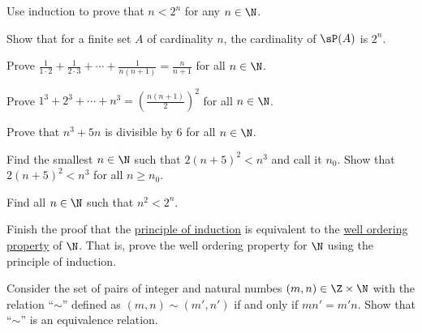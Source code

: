 \documentclass[12pt]{book}
\begin{document}
\begin{exercise}
Use induction to prove that $n < 2^n$ for any $n\in\N$.
\end{exercise}

\begin{exercise}
Show that for a finite set $A$ of cardinality $n$, the cardinality
of $\sP(A)$ is $2^n$.
\end{exercise}

\begin{exercise}
Prove $\frac{1}{1\cdot 2} + 
\frac{1}{2\cdot 3} + \cdots + \frac{1}{n(n+1)} = \frac{n}{n+1}$
for all $n \in \N$.
\end{exercise}

\begin{exercise}
Prove $1^3 + 2^3 + \cdots + n^3 = {\left( \frac{n(n+1)}{2} \right)}^2$
for all $n \in \N$.
\end{exercise}

\begin{exercise}
Prove that $n^3 + 5n$ is divisible by $6$ for all $n \in \N$.
\end{exercise}

\begin{exercise}
Find the smallest $n \in \N$ such that $2{(n+5)}^2 < n^3$ and call it $n_0$.
Show that $2{(n+5)}^2 < n^3$ for all $n \geq n_0$.
\end{exercise}

\begin{exercise}
Find all $n \in \N$ such that $n^2 < 2^n$.
\end{exercise}

\begin{exercise}
Finish the proof that the \hyperref[induction:thm]{principle of induction} is equivalent to the
\hyperlink{wop:link}{well ordering property}  of $\N$.
That is, prove the well ordering property for $\N$ using the principle of induction.
\end{exercise}

\begin{exercise} Consider the set of pairs of integer and natural numbes $(m,n)\in \Z\times \N$ with the relation ``$\sim$'' defined as $(m,n)\sim (m',n')$ if and only if $mn'=m'n$. 
Show that ``$\sim$'' is an equivalence relation.
\end{exercise}

 
\end{document}
